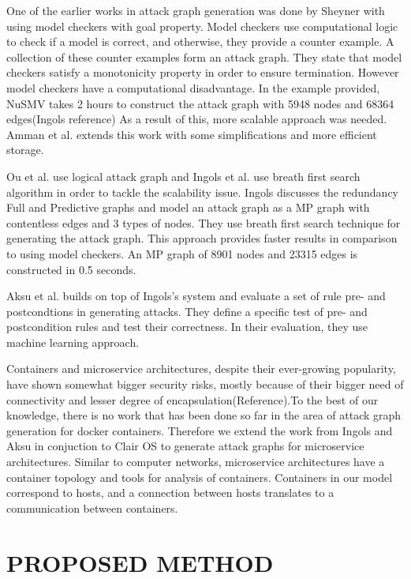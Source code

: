 \documentclass[letterpaper, 10 pt, conference]{ieeeconf}  %
\begin{document}
One of the earlier works in attack graph generation was done by Sheyner with using model checkers with goal property.\cite{ingols} Model checkers use computational logic to check if a model is correct, and otherwise, they provide a counter example. A collection of these counter examples form an attack graph. They state that model checkers satisfy a monotonicity property in order to ensure termination. However model checkers have a computational disadvantage. In the example provided, NuSMV takes 2 hours to construct the attack graph with 5948 nodes and 68364 edges(Ingols reference) As a result of this, more scalable approach was needed. Amman et al. extends this work with some simplifications and more efficient storage.\cite{amman}

Ou et al. use logical attack graph\cite{ou} and Ingols\cite{ingols} et al. use breath first search algorithm in order to tackle the scalability issue. Ingols discusses the redundancy Full and Predictive graphs and model an attack graph as a MP graph with contentless edges and 3 types of nodes. They use breath first search technique for generating the attack graph. This approach provides faster results in comparison to using model checkers. An MP graph of 8901 nodes and 23315 edges is constructed in 0.5 seconds.

Aksu et al. builds on top of Ingols's system and evaluate a set of rule pre- and postcondtions in generating attacks.\cite{aksu} They define a specific test of pre- and postcondition rules and test their correctness. In their evaluation, they use machine learning approach.

Containers and microservice architectures, despite their ever-growing popularity, have shown somewhat bigger security risks, mostly because of their bigger need of connectivity and lesser degree of encapsulation(Reference).To the best of our knowledge, there is no work that has been done so far in the area of attack graph generation for docker containers. Therefore we extend the work from Ingols\cite{ingols} and Aksu\cite{aksu} in conjuction to Clair OS to generate attack graphs for microservice architectures. Similar to computer networks, microservice architectures have a container topology and tools for analysis of containers. Containers in our model correspond to hosts, and a connection between hosts translates to a communication between containers. 

\section{PROPOSED METHOD}
\end{document}
